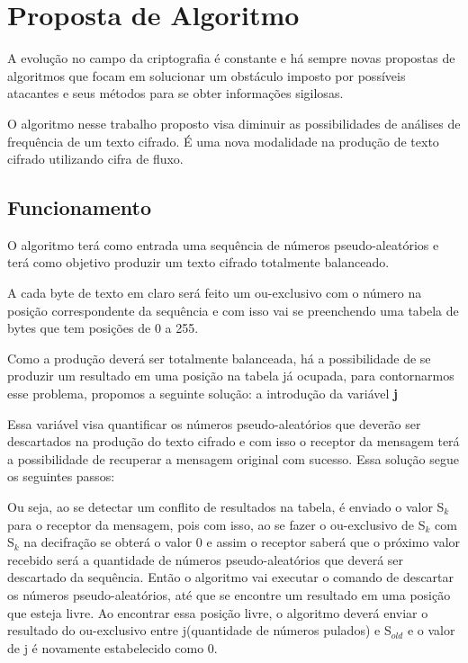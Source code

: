 \chapter{Proposta de Algoritmo}
\label{algorithm-proposition}

A evolução no campo da criptografia é constante e há sempre novas propostas de algoritmos que focam em solucionar um obstáculo imposto por possíveis atacantes e seus métodos para se obter informações sigilosas.

O algoritmo nesse trabalho proposto visa diminuir as possibilidades de análises de frequência de um texto cifrado. É uma nova modalidade na produção de texto cifrado utilizando cifra de fluxo. 

\section{Funcionamento}
\label{functioning}

O algoritmo terá como entrada uma sequência de números pseudo-aleatórios e terá como objetivo produzir um texto cifrado totalmente balanceado.

A cada byte de texto em claro será feito um ou-exclusivo com o número na posição correspondente da sequência e com isso vai se preenchendo uma tabela de bytes que tem posições de 0 a 255.


Como a produção deverá ser totalmente balanceada, há a possibilidade de se produzir um resultado em uma posição na tabela já ocupada, para contornarmos esse problema, propomos a seguinte solução: a introdução da variável \textbf{j}


Essa variável visa quantificar os números pseudo-aleatórios que deverão ser descartados na produção do texto cifrado e com isso o receptor da mensagem terá a possibilidade de recuperar a mensagem original com sucesso. Essa solução segue os seguintes passos:


Ou seja, ao se detectar um conflito de resultados na tabela, é enviado o valor S$_k$ para o receptor da mensagem, pois com isso, ao se fazer o ou-exclusivo de S$_k$ com S$_k$ na decifração se obterá o valor 0 e assim o receptor saberá que o próximo valor recebido será a quantidade de números pseudo-aleatórios que deverá ser descartado da sequência. Então o algoritmo vai executar o comando de descartar os números pseudo-aleatórios, até que se encontre um resultado em uma posição que esteja livre. Ao encontrar essa posição livre, o algoritmo deverá enviar o resultado do ou-exclusivo entre j(quantidade de números pulados) e S$_{old}$ e o valor de j é novamente estabelecido como 0.

